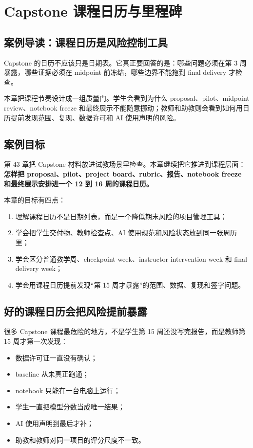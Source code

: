 \chapter{Capstone 课程日历与里程碑}

\section{案例导读：课程日历是风险控制工具}

Capstone 的日历不应该只是日期表。它真正要回答的是：哪些问题必须在第 3 周暴露，哪些证据必须在 midpoint 前冻结，哪些边界不能拖到 final delivery 才检查。

本章把课程节奏设计成一组质量门。学生会看到为什么 proposal、pilot、midpoint review、notebook freeze 和最终展示不能随意挪动；教师和助教则会看到如何用日历提前发现范围、复现、数据许可和 AI 使用声明的风险。

\section{案例目标}

第 43 章把 Capstone 材料放进试教场景里检查。本章继续把它推进到课程层面：\textbf{怎样把 proposal、pilot、project board、rubric、报告、notebook freeze 和最终展示安排进一个 12 到 16 周的课程日历。}

本章的目标有四点：

\begin{enumerate}
    \item 理解课程日历不是日期列表，而是一个降低期末风险的项目管理工具；
    \item 学会把学生交付物、教师检查点、AI 使用规范和风险状态放到同一张周历里；
    \item 学会区分普通教学周、checkpoint week、instructor intervention week 和 final delivery week；
    \item 学会用课程日历提前发现“第 15 周才暴露”的范围、数据、复现和签字问题。
\end{enumerate}

\section{好的课程日历会把风险提前暴露}

很多 Capstone 课程最危险的地方，不是学生第 15 周还没写完报告，而是教师第 15 周才第一次发现：

\begin{itemize}
    \item 数据许可证一直没有确认；
    \item baseline 从未真正跑通；
    \item notebook 只能在一台电脑上运行；
    \item 学生一直把模型分数当成唯一结果；
    \item AI 使用声明到最后才补；
    \item 助教和教师对同一项目的评分尺度不一致。
\end{itemize}

